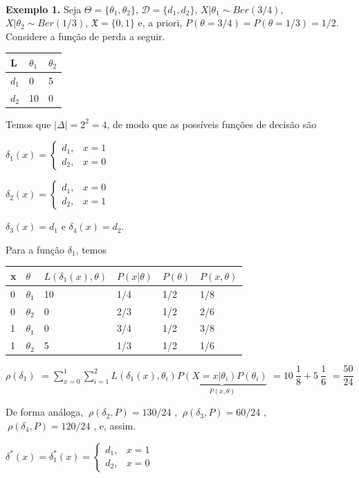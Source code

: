 \documentclass[
]{book}
\begin{document}
\(~\)

\textbf{Exemplo 1.} Seja \(\Theta=\{\theta_1,\theta_2\}\), \(\mathcal{D}=\{d_1,d_2\}\), \(X|\theta_1\sim Ber(3/4)\), \(X|\theta_2 \sim Ber(1/3)\), \(\mathfrak{X}=\{0,1\}\) e, a priori, \(P(\theta=3/4)=P(\theta=1/3)=1/2\). Considere a função de perda a seguir.

\begin{longtable}[]{@{}lll@{}}
\toprule
L & \(\theta_1\) & \(\theta_2\) \\
\midrule
\endhead
\(d_1\) & 0 & 5 \\
\(d_2\) & 10 & 0 \\
\bottomrule
\end{longtable}

Temos que \(|\Delta| = 2^2=4\), de modo que as possíveis funções de decisão são

\(\delta_1(x)=\left\{\begin{array}{lr} d_1, & x=1\\ d_2, &x=0\end{array}\right.\)

\(\delta_2(x)=\left\{\begin{array}{lr} d_1, & x=0\\ d_2, &x=1\end{array}\right.\)

\(\delta_3(x)=d_1\) e \(\delta_4(x)=d_2\).

Para a função \(\delta_1\), temos

\begin{longtable}[]{@{}llllll@{}}
\toprule
x & \(\theta\) & \(L(\delta_1(x),\theta)\) & \(P(x|\theta)\) & \(P(\theta)\) & \(P(x,\theta)\) \\
\midrule
\endhead
0 & \(\theta_1\) & 10 & 1/4 & 1/2 & 1/8 \\
0 & \(\theta_2\) & 0 & 2/3 & 1/2 & 2/6 \\
1 & \(\theta_1\) & 0 & 3/4 & 1/2 & 3/8 \\
1 & \(\theta_2\) & 5 & 1/3 & 1/2 & 1/6 \\
\bottomrule
\end{longtable}

\(\rho(\delta_1)\) \(=\displaystyle \sum_{x=0}^1\sum_{i=1}^2L(\delta_1(x),\theta_i)\underbrace{P(X=x|\theta_i)P(\theta_i)}_{P(x,\theta)}\) \(=10~\dfrac{1}{8}+5~\dfrac{1}{6}\) \(=\dfrac{50}{24}\)

De forma análoga, \(~\rho(\delta_2,P)=130/24\) , \(~\rho(\delta_3,P)=60/24\) , \(~\rho(\delta_4,P)=120/24\) , e, assim.

\({\delta}^*(x)={\delta}^*_1(x)=\left\{\begin{array}{rl} d_1, & x=1\\ d_2, & x=0\end{array}\right.\)
\end{document}
